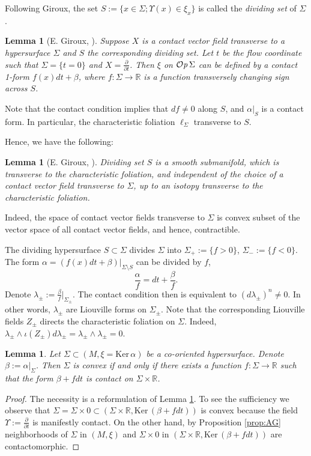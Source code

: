 \documentclass[12pt]{amsart}
\theoremstyle{plain}
\newtheorem{lemma}[theorem]{Lemma}
\theoremstyle{definition}
\theoremstyle{remark}
\newcommand{\R}{\mathbb{R}}
\newcommand{\p}{\partial}
\newcommand{\Ker}{\mathrm{Ker\,}}
\newcommand{\Op}{ {\mathcal O}{\it p}\,}
\begin{document}
  
 
Following Giroux, the set   $S:=\{x\in\Sigma;\Upsilon(x)\in\xi_x\}$ is called the {\em dividing set} of $\Sigma$.
\begin{lemma}[E. Giroux, \cite{Gi}]\label{lm:div-form}
Suppose $X$ is  a contact vector field transverse to a hypersurface $\Sigma$ and $S$ the corresponding dividing set. Let $t$   be the flow   coordinate such that $\Sigma=\{t=0\}$ and $X=\frac{\p}{\p t}$. Then  $\xi$ on $\Op  \Sigma$ can be defined by   a  contact 1-form
$f(x)dt+\beta$, where  $f:\Sigma \to\R$ is a function transversely changing sign across $S$. \end{lemma}
Note that the contact condition implies that $df\neq 0$ along $S$, and $\alpha|_{S}$ is a contact form.  In particular, the characteristic foliation $\ell_\Sigma$ transverse to $S$.




  Hence, we have the following:
\begin{lemma}[E. Giroux, \cite{Gi}]\label{lm:div-set}
 Dividing  set $S$ is a smooth submanifold, which is transverse to the characteristic foliation, and independent of the choice of a contact vector field transverse to $\Sigma$,  up to an isotopy  transverse to the characteristic foliation.
\end{lemma}
Indeed, the space of contact vector fields transverse to $\Sigma$ is convex subset of the vector space of all contact vector fields, and hence, contractible.

\medskip The  dividing hypersurface  $S\subset\Sigma$ divides $\Sigma$ into
$\Sigma_+:=\{f>0\}$, $\Sigma_-:=\{f<0\}$.
The form $\alpha=(f(x)dt+\beta)|_{\Sigma\setminus S}$ can be divided 
by $f$,
$$\frac{\alpha}{f}=dt+\frac{\beta}f.$$
Denote $\lambda_\pm:=\frac{\beta}f|_{\Sigma_\pm}$.
The contact condition then is equivalent to $(d\lambda_\pm)^n\neq 0$.
In other words,  $\lambda_\pm$ are Liouville forms on $\Sigma_\pm$.
Note that the corresponding Liouville fields $Z_\pm$ directs the characteristic foliation on $\Sigma$. Indeed, $\lambda_\pm\wedge \iota(Z_\pm) d\lambda_\pm=\lambda_\pm\wedge\lambda_\pm=0.$

 
  
\begin{lemma}\label{lm:Giroux-inverse}
Let $\Sigma\subset (M,\xi=\Ker\alpha)$ be   a co-oriented hypersurface.  Denote $\beta:=\alpha|_\Sigma$.
Then $\Sigma$ is convex if and only if there exists a function $f:\Sigma\to\R$ such that the form $\beta+fdt$ is contact on $\Sigma\times\R$.
\end{lemma}
\begin{proof} The necessity is a reformulation of Lemma \ref{lm:div-form}. To see the sufficiency we observe that $\Sigma=\Sigma\times 0\subset (\Sigma\times\R,\Ker(\beta+fdt))$ is convex because the field $\Upsilon:=\frac{\p}{\p t}$ is  manifestly contact.
On the other hand, by Proposition \ref{prop:AG} neighborhoods of $\Sigma$ in $(M,\xi)$ and  $\Sigma\times 0$ in  $(\Sigma\times\R,\Ker(\beta+fdt))$ are contactomorphic.
\end{proof}
\end{document}
